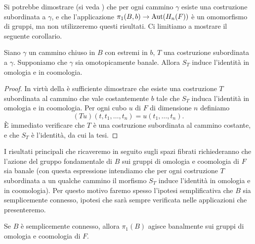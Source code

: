 Si potrebbe dimostrare (si veda ) che per ogni cammino \(\gamma\) esiste una costruzione subordinata a \(\gamma\), e che l'applicazione \(\pi_1(B,b)\to\operatorname{Aut}(H_n(F))\) è un omomorfismo di gruppi, ma non utilizzeremo questi risultati.
Ci limitiamo a mostrare il seguente corollario.
\begin{corollary}
Siano \(\gamma\) un cammino chiuso in \(B\) con estremi in \(b\), \(T\) una costruzione subordinata a \(\gamma\). Supponiamo che \(\gamma\) sia omotopicamente banale. Allora \(S_T\) induce l'identità in omologia e in coomologia.
\end{corollary}
\begin{proof}
In virtù della  è sufficiente dimostrare che esiste una costruzione \(T\) subordinata al cammino che vale costantemente \(b\) tale che \(S_T\) induca l'identità in omologia e in coomologia. Per ogni cubo \(u\) di \(F\) di dimensione \(n\) definiamo
\[
(Tu)(t,t_1,\ldots,t_n)=u(t_1,\ldots,t_n).
\]
È immediato verificare che \(T\) è una costruzione subordinata al cammino costante, e che \(S_T\) è l'identità, da cui la tesi.
\end{proof}

I risultati principali che ricaveremo in seguito sugli spazi fibrati richiederanno che l'azione del gruppo fondamentale di \(B\) sui gruppi di omologia e coomologia di \(F\) sia banale (con questa espressione intendiamo che per ogni costruzione \(T\) subordinata a un qualche cammino il morfismo \(S_T\) induce l'identità in omologia e in coomologia). Per questo motivo faremo spesso l'ipotesi semplificativa che \(B\) sia semplicemente connesso, ipotesi che sarà sempre verificata nelle applicazioni che presenteremo.

\begin{corollary}
Se \(B\) è semplicemente connesso, allora \(\pi_1(B)\) agisce banalmente sui gruppi di omologia e coomologia di \(F\).
\end{corollary}

